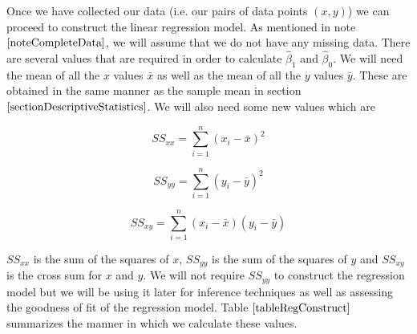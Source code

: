 Once we have collected our data (i.e. our pairs of data points $(x, y)$) 
we can proceed to construct the linear regression model.
As mentioned in note $\ref{noteCompleteData}$, we will assume that we do not have any missing data.
There are several values that are required in order to calculate $\hat{\beta}_{1}$
and $\hat{\beta}_{0}$.
We will need the mean of all the $x$ values $\bar{x}$ 
as well as the mean of all the $y$ values $\bar{y}$.
These are obtained in the same manner as the sample mean in section $\ref{sectionDescriptiveStatistics}$.
We will also need some new values which are 

\begin{skeleton}
	\begin{equation}
	\label{equationSSxx}
	SS_{xx} = \sum_{i=1}^{n} (x_{i} - \bar{x})^{2}
	\end{equation}
\end{skeleton}

\begin{skeleton}
	\begin{equation}
	\label{equationSSyy}
	SS_{yy} = \sum_{i=1}^{n} (y_{i} - \bar{y})^{2}
	\end{equation}
\end{skeleton}

\begin{skeleton}
	\begin{equation}
	\label{equationSSxy}
	SS_{xy} = \displaystyle\sum_{i=1}^{n} (x_{i} - \bar{x}) (y_{i} - \bar{y})
	\end{equation}
\end{skeleton}
\hfill

\noindent
$SS_{xx}$ is the sum of the squares of $x$,
$SS_{yy}$ is the sum of the squares of $y$ 
and
$SS_{xy}$ is the cross sum for $x$ and $y$.
We will not require $SS_{yy}$ to construct the regression model but we will be 
using it later for inference techniques as well as assessing the goodness of fit of the regression model.
Table $\ref{tableRegConstruct}$ summarizes the manner in which we calculate these values.
\hfill

